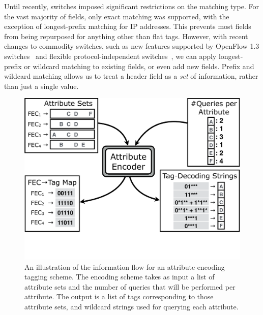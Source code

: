 Until recently, switches imposed significant restrictions on the matching type.  For the vast majority of fields, only exact matching was supported, with the exception of longest-prefix matching for IP addresses. This prevents most fields from being repurposed for anything other than flat tags. However, with recent changes to commodity switches, such as new features supported by OpenFlow 1.3 switches~\cite{of13} and flexible protocol-independent switches~\cite{P4}, we can apply longest-prefix or wildcard matching to existing fields, or even add new fields. Prefix and wildcard matching allows us to treat a header field as a \emph{set} of information, rather than just a single value. 


\begin{figure}[t!] 
\begin{minipage}{1\linewidth}
\includegraphics[trim={0 4cm 0 0}, clip, width=\linewidth]{figures/system_flow2}
\end{minipage} 
\caption{An illustration of the information flow for an attribute-encoding tagging scheme. The encoding scheme takes as input a list of attribute sets and the number of queries that will be performed per attribute. The output is a list of tags corresponding to those attribute sets, and wildcard strings used for querying each attribute.}
\label{fig:system_flow}
\end{figure}


